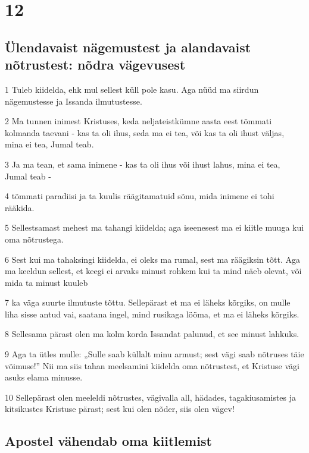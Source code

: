 \chapter{12}

\section*{Ülendavaist nägemustest ja alandavaist nõtrustest: nõdra vägevusest}

\par 1 Tuleb kiidelda, ehk mul sellest küll pole kasu. Aga nüüd ma siirdun nägemustesse ja Issanda ilmutustesse.
\par 2 Ma tunnen inimest Kristuses, keda neljateistkümne aasta eest tõmmati kolmanda taevani - kas ta oli ihus, seda ma ei tea, või kas ta oli ihust väljas, mina ei tea, Jumal teab.
\par 3 Ja ma tean, et sama inimene - kas ta oli ihus või ihust lahus, mina ei tea, Jumal teab -
\par 4 tõmmati paradiisi ja ta kuulis räägitamatuid sõnu, mida inimene ei tohi rääkida.
\par 5 Sellestsamast mehest ma tahangi kiidelda; aga iseenesest ma ei kiitle muuga kui oma nõtrustega.
\par 6 Sest kui ma tahaksingi kiidelda, ei oleks ma rumal, sest ma räägiksin tõtt. Aga ma keeldun sellest, et keegi ei arvaks minust rohkem kui ta mind näeb olevat, või mida ta minust kuuleb
\par 7 ka väga suurte ilmutuste tõttu. Sellepärast et ma ei läheks kõrgiks, on mulle liha sisse antud vai, saatana ingel, mind rusikaga lööma, et ma ei läheks kõrgiks.
\par 8 Sellesama pärast olen ma kolm korda Issandat palunud, et see minust lahkuks.
\par 9 Aga ta ütles mulle: „Sulle saab küllalt minu armust; sest vägi saab nõtruses täie võimuse!” Nii ma siis tahan meelsamini kiidelda oma nõtrustest, et Kristuse vägi asuks elama minusse.
\par 10 Sellepärast olen meeleldi nõtrustes, vägivalla all, hädades, tagakiusamistes ja kitsikustes Kristuse pärast; sest kui olen nõder, siis olen vägev!

\section*{Apostel vähendab oma kiitlemist}

